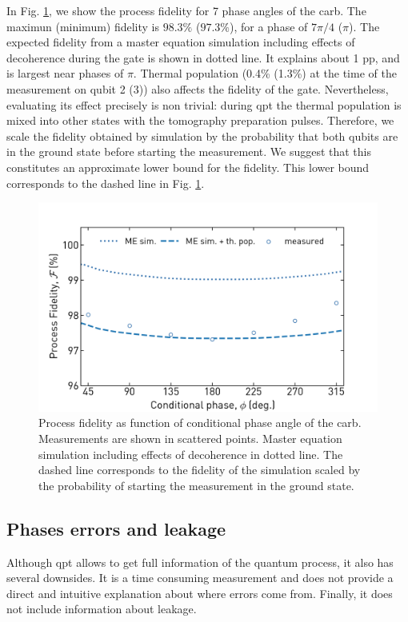 In Fig. \ref{fig:carb_characterization_process_fidelity}, we show the process fidelity for 7 phase angles of the \gls{carb}. The maximun (minimum) fidelity is $98.3\%$ ($97.3\%$), for a phase of $7\pi/4$ ($\pi$). The expected fidelity from a master equation simulation including effects of decoherence during the gate is shown in dotted line. It explains about 1 \gls{pp}, and is largest near phases of $\pi$. Thermal population  (0.4\% (1.3\%) at the time of the measurement on qubit 2 (3)) also affects the fidelity of the gate. Nevertheless, evaluating its effect precisely is non trivial: during \gls{qpt} the thermal population is mixed into other states with the tomography preparation pulses. Therefore, we scale the fidelity obtained by simulation by the probability that both qubits are in the ground state before starting the measurement. We suggest that this constitutes an approximate lower bound for the fidelity. This lower bound corresponds to the dashed line in Fig. \ref{fig:carb_characterization_process_fidelity}. 

\begin{figure}[ht]
    \centering
    \includegraphics[width=\textwidth]{chapters/carb_gate/figs/ch4_characterization_tomo_all_angles_20200124_162200.png}
    \caption{Process fidelity as function of conditional phase angle of the \gls{carb}. Measurements are shown in scattered points.  Master equation simulation including effects of decoherence in dotted line. The dashed line corresponds to the fidelity of the simulation scaled by the probability of starting the measurement in the ground state. }
    \label{fig:carb_characterization_process_fidelity}
\end{figure}

\subsection{Phases errors and leakage} \label{sec:carb_characterization_phase_errors_leakage}
Although \gls{qpt} allows to get full information of the quantum process, it also has several downsides. It is a time consuming measurement and does not provide a direct and intuitive explanation about where errors come from. Finally, it does not include information about leakage. 

